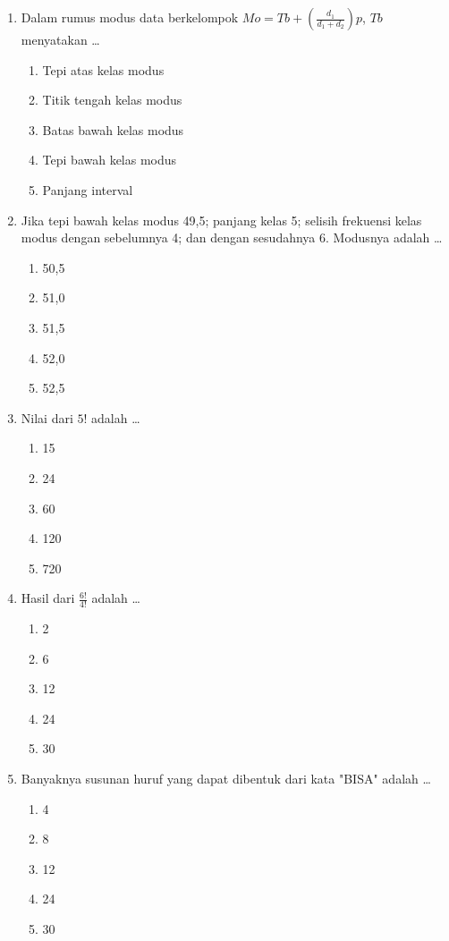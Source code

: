\documentclass[12pt,a4paper]{article}
\begin{document}
\begin{enumerate}[leftmargin=*]
\item Dalam rumus modus data berkelompok $Mo = Tb + \left(\frac{d_1}{d_1 + d_2}\right) p$, $Tb$ menyatakan \dots
    \begin{enumerate}[label=\alph*.]
        \item Tepi atas kelas modus
        \item Titik tengah kelas modus
        \item Batas bawah kelas modus
        \item Tepi bawah kelas modus
        \item Panjang interval
    \end{enumerate}

\item Jika tepi bawah kelas modus 49,5; panjang kelas 5; selisih frekuensi kelas modus dengan sebelumnya 4; dan dengan sesudahnya 6. Modusnya adalah \dots
    \begin{enumerate}[label=\alph*.]
        \item 50,5
        \item 51,0
        \item 51,5
        \item 52,0
        \item 52,5
    \end{enumerate}

\item Nilai dari $5!$ adalah \dots
    \begin{enumerate}[label=\alph*.]
        \item 15
        \item 24
        \item 60
        \item 120
        \item 720
    \end{enumerate}

\item Hasil dari $\frac{6!}{4!}$ adalah \dots
    \begin{enumerate}[label=\alph*.]
        \item 2
        \item 6
        \item 12
        \item 24
        \item 30
    \end{enumerate}

\item Banyaknya susunan huruf yang dapat dibentuk dari kata "BISA" adalah \dots
    \begin{enumerate}[label=\alph*.]
        \item 4
        \item 8
        \item 12
        \item 24
        \item 30
    \end{enumerate}


\end{enumerate}
\end{document}
